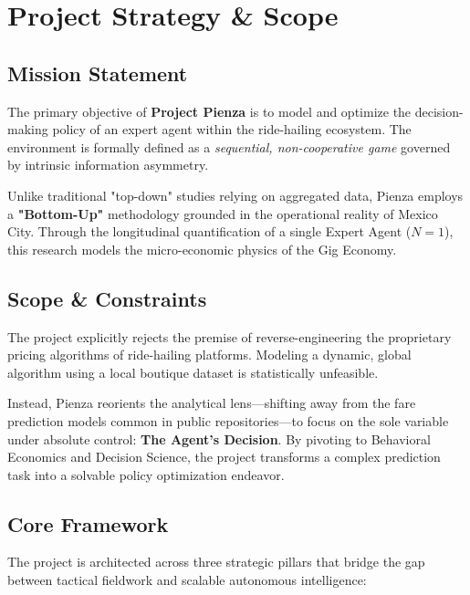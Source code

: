 \section{Project Strategy \& Scope}

\subsection{Mission Statement}
The primary objective of \textbf{Project Pienza} is to model and optimize the decision-making policy of an expert agent within the ride-hailing ecosystem. The environment is formally defined as a \textit{sequential, non-cooperative game} governed by intrinsic information asymmetry. 

Unlike traditional "top-down" studies relying on aggregated data, Pienza employs a \textbf{"Bottom-Up"} methodology grounded in the operational reality of Mexico City. Through the longitudinal quantification of a single Expert Agent ($N=1$), this research models the micro-economic physics of the Gig Economy.

\subsection{Scope \& Constraints}
The project explicitly rejects the premise of reverse-engineering the proprietary pricing algorithms of ride-hailing platforms. Modeling a dynamic, global algorithm using a local boutique dataset is statistically unfeasible. 

Instead, Pienza reorients the analytical lens—shifting away from the fare prediction models common in public repositories—to focus on the sole variable under absolute control: \textbf{The Agent's Decision}. By pivoting to Behavioral Economics and Decision Science, the project transforms a complex prediction task into a solvable policy optimization endeavor.

\subsection{Core Framework}
The project is architected across three strategic pillars that bridge the gap between tactical fieldwork and scalable autonomous intelligence:

